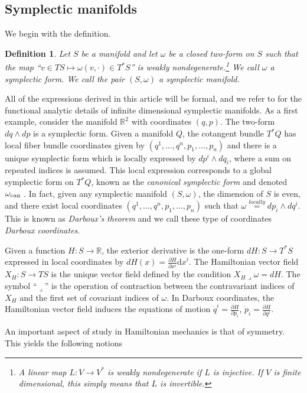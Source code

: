 \documentclass[12pt]{amsart}
\newcommand{\pder}[2]{\ensuremath{\frac{\partial #1}{\partial #2}}}
\newcommand{\R}{\ensuremath{\mathbb{R}}}
\newcommand{\dx}{\ensuremath{\textrm{d}x}}
\newtheorem{defn}[thm]{Definition}
\begin{document}
\subsection{Symplectic manifolds}
\label{sec:Symplectic}
We begin with the definition.
\begin{defn}
  Let $S$ be a manifold
  and let $\omega$ be a closed two-form on $S$ such that the map
  ``$v \in TS \mapsto \omega( v , \cdot ) \in T^*S$'' is weakly nondegenerate.\footnote{
    A linear map $L:V \to V^*$ is \emph{weakly nondegenerate} if $L$ is injective.  If $V$ is finite dimensional, this simply means that $L$ is invertible.}
  We call $\omega$ a \emph{symplectic form}.
  We call the pair $(S,\omega)$ a \emph{symplectic manifold}.
\end{defn}
All of the expressions derived in this article will be formal, and we refer to \cite{GayBalmazVizman2012}
for the functional analytic details of infinite dimensional symplectic manifolds.
As a first example, consider the manifold $\R^2$
with coordinates $(q,p)$.
The two-form $dq \wedge dp$ is a symplectic form.
Given a manifold $Q$,
the cotangent bundle $T^*Q$ has local fiber bundle coordinates
given by $(q^1,\dots, q^n,p_1,\dots,p_n)$ and there is a unique symplectic form
which is locally expressed by $dp^i \wedge dq_i$, where
a sum on repeated indices is assumed.
This local expression corresponds to a global symplectic
form on $T^*Q$, known as the \emph{canonical symplectic form}
and denoted $\omega_{\rm can}$ \cite[Theorem 3.2.10]{FOM}.
In fact, given any symplectic manifold $(S,\omega)$, the dimension of $S$
is even, and there exist local coordinates $(q^1,\dots,q^n,p_1,\dots,p_n)$
such that $\omega \stackrel{locally}{=} dp_i \wedge dq^i$.
This is known as \emph{Darboux's theorem} and we call these type of
coordinates \emph{Darboux coordinates}\cite[Theorem 3.2.2]{FOM}.

Given a function $H:S \to \mathbb{R}$,
the exterior derivative is the one-form $dH:S \to T^*S$
expressed in local coordinates by $dH(x) = \pder{H}{x^i} \dx^i$.
The Hamiltonian vector field $X_H:S \to TS$ is the unique vector
field defined by the condition
$
  X_H \lrcorner \omega = dH.
$
The symbol ``$\lrcorner$'' is the operation of contraction between
the contravariant indices of $X_H$ and the first set of covariant
indices of $\omega$.
In Darboux coordinates, the Hamiltonian vector field induces the
equations of motion $\dot{q}^i = \pder{H}{p_i}$, $\dot{p}_i = \pder{H}{q^i}$.


An important aspect of study in Hamiltonian mechanics is that of symmetry.
This yields the following notions
\end{document}
